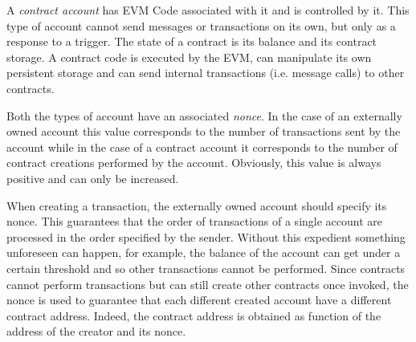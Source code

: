 A \emph{contract account} has EVM Code associated with it and is controlled by
it. This type of account cannot send messages or transactions on its own, but
only as a response to a trigger. The state of a contract is its balance and its
contract storage. A contract code is executed by the EVM, can manipulate its own
persistent storage and can send internal transactions (i.e. message calls) to
other contracts.

Both the types of account have an associated \emph{nonce}. In the case of an
externally owned account this value corresponds to the number of transactions
sent by the account while in the case of a contract account it corresponds to
the number of contract creations performed by the account. Obviously, this value
is always positive and can only be increased.

When creating a transaction, the externally owned account should specify its
nonce. This guarantees that the order of transactions of a single account are
processed in the order specified by the sender. Without this expedient something
unforeseen can happen, for example, the balance of the account can get under a
certain threshold and so other transactions cannot be performed. Since contracts
cannot perform transactions but can still create other contracts once invoked,
the nonce is used to guarantee that each different created account have a
different contract address. Indeed, the contract address is obtained as function
of the address of the creator and its nonce.
